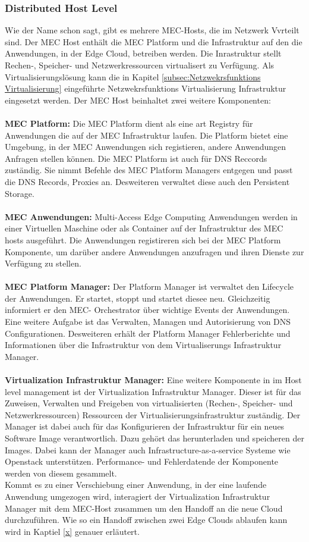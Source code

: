 \documentclass[runningheads]{llncs}
\numberwithin{figure}{section}
\begin{document}
\subsubsection{Distributed Host Level}
Wie der Name schon sagt, gibt es mehrere MEC-Hosts, die im Netzwerk Vvrteilt sind.
Der MEC Host enthält die MEC Platform und die Infrastruktur auf den die Anwendungen, in der Edge Cloud, betreiben werden.
Die Inrastruktur stellt Rechen-, Speicher- und Netzwerkressourcen virtualisert zu Verfügung. Als Virtualisierungslösung kann
die in Kapitel \ref{subsec:Netzwekrsfunktions Virtualisierung} eingeführte Netzwekrsfunktions Virtualisierung Infrastruktur
eingesetzt werden. Der MEC Host beinhaltet zwei weitere Komponenten:
\\
\\
\textbf{MEC Platform:} Die MEC Platform dient als eine art Registry für  
Anwendungen die auf der MEC Infrastruktur laufen. Die Platform bietet eine Umgebung, in der MEC Anwendungen sich registieren,
andere Anwendungen Anfragen stellen können. Die MEC Platform ist auch für DNS Reccords zuständig. Sie nimmt Befehle
des MEC Platform Managers entgegen und passt die DNS Records, Proxies an. Desweiteren verwaltet diese auch den Persistent Storage.
\\
\\
\textbf{MEC Anwendungen:} Multi-Access Edge Computing Anwendungen werden in einer Virtuellen Maschine oder als
Container auf der Infrastruktur des MEC hosts ausgeführt. Die Anwendungen registireren sich bei der MEC Platform
Komponente, um darüber andere Anwendungen anzufragen und ihren Dienste zur Verfügung zu stellen.
\\
\\
\textbf{MEC Platform Manager:} Der Platform Manager ist verwaltet den Lifecycle der Anwendungen. Er startet, stoppt und startet diesee neu.
Gleichzeitig informiert er den MEC- Orchestrator über wichtige Events der Anwendungen. 
Eine weitere Aufgabe ist das Verwalten, Managen und Autorisierung von DNS Configurationen.
Desweiteren erhält der Platform Manager Fehlerberichte und Informationen über die Infrastruktur von dem Virtualiserungs Infrastruktur Manager.
\\
\\ 
\textbf{Virtualization Infrastruktur Manager:} Eine weitere Komponente in im Host level management ist der Virtualization Infrastruktur
Manager. Dieser ist für das Zuweisen, Verwalten und Freigeben von virtualisierten (Rechen-, Speicher- und Netzwerkressourcen)
Ressourcen der Virtualisierungsinfrastruktur zuständig. Der Manager ist dabei auch für das Konfigurieren der Infrastruktur für 
ein neues Software Image verantwortlich. Dazu gehört das herunterladen und speicheren der Images. Dabei kann der Manager auch 
Infrastructure-as-a-service Systeme wie Openstack unterstützen. Performance- und Fehlerdatende der Komponente werden von diesem gesammelt.
\\
Kommt es zu einer Verschiebung einer Anwendung, in der eine laufende Anwendung umgezogen wird,
interagiert der Virtualization Infrastruktur Manager mit dem MEC-Host zusammen um den Handoff an die neue Cloud durchzuführen.
Wie so ein Handoff zwischen zwei Edge Clouds ablaufen kann wird in Kaptiel \ref{x} genauer erläutert.
\end{document}
